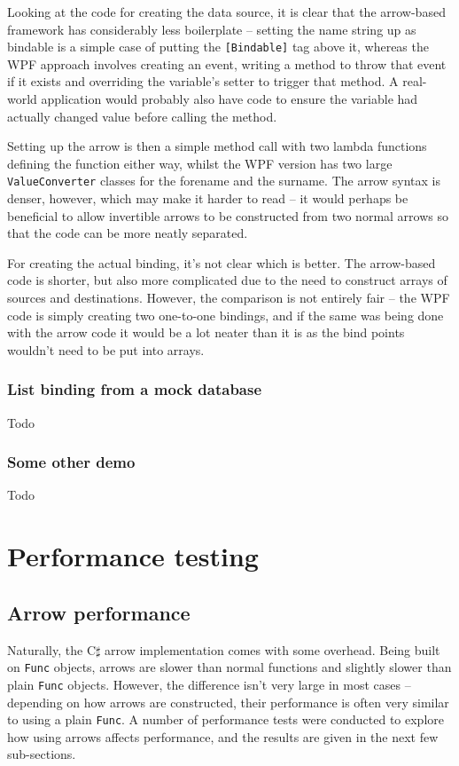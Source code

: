\documentclass[12pt,twoside,notitlepage]{report}
\begin{document}
Looking at the code for creating the data source, it is clear that the arrow-based framework has considerably less boilerplate -- setting the name string up as bindable is a simple case of putting the \texttt{[Bindable]} tag above it, whereas the WPF approach involves creating an event, writing a method to throw that event if it exists and overriding the variable's setter to trigger that method. A real-world application would probably also have code to ensure the variable had actually changed value before calling the method.

Setting up the arrow is then a simple method call with two lambda functions defining the function either way, whilst the WPF version has two large \texttt{ValueConverter} classes for the forename and the surname. The arrow syntax is denser, however, which may make it harder to read -- it would perhaps be beneficial to allow invertible arrows to be constructed from two normal arrows so that the code can be more neatly separated.

For creating the actual binding, it's not clear which is better. The arrow-based code is shorter, but also more complicated due to the need to construct arrays of sources and destinations. However, the comparison is not entirely fair -- the WPF code is simply creating two one-to-one bindings, and if the same was being done with the arrow code it would be a lot neater than it is as the bind points wouldn't need to be put into arrays.

\subsubsection{List binding from a mock database}

Todo

\subsubsection{Some other demo}

Todo

\section{Performance testing}

\subsection{Arrow performance}

Naturally, the C$\sharp$ arrow implementation comes with some overhead. Being built on \texttt{Func} objects, arrows are slower than normal functions and slightly slower than plain \texttt{Func} objects. However, the difference isn't very large in most cases -- depending on how arrows are constructed, their performance is often very similar to using a plain \texttt{Func}. A number of performance tests were conducted to explore how using arrows affects performance, and the results are given in the next few sub-sections.
\end{document}
